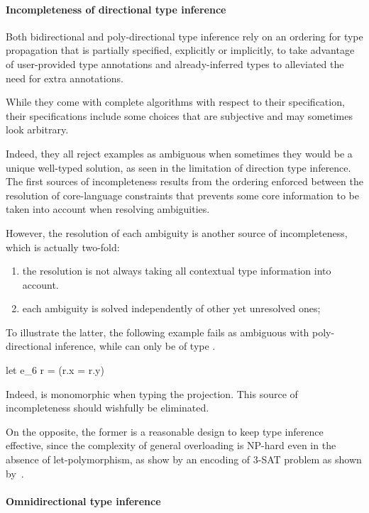 \documentclass[acmsmall,screen,nonacm]{acmart}
\begin{document}
\paragraph{Incompleteness of directional type inference}

Both bidirectional and poly-directional type inference rely on an ordering
for type propagation that is partially specified, explicitly or implicitly,
to take advantage of user-provided type annotations and already-inferred types
to alleviated the need for extra annotations.

While they come with complete algorithms with respect to their
specification, their specifications include some choices that are subjective
and may sometimes look arbitrary.

Indeed, they all reject examples as ambiguous when sometimes they would be a
unique well-typed solution, as seen in the limitation of direction type
inference.  The first sources of incompleteness results from the ordering
enforced between the resolution of core-language constraints that prevents
some core information to be taken into account when resolving ambiguities.

However, the resolution of each ambiguity is another source of
incompleteness, which is actually two-fold:
\begin{enumerate}
\item  
  the resolution is not always taking all contextual type information into
  account.  
\item
  each ambiguity is solved independently of other yet unresolved ones;
\end{enumerate}
To illustrate the latter, the following example fails as ambiguous with
poly-directional inference, while  can only be of type
.  
\begin{program}[error]
let e_6 r = (r.x = r.y)
\end{program}
Indeed,  is monomorphic when typing the projection.  This source of
incompleteness should wishfully be eliminated.

On the opposite, the former is a reasonable design to keep type inference
effective, since the complexity of general overloading is NP-hard even in
the absence of let-polymorphism, as show by an encoding of 3-SAT problem as
shown by~\citet {Chargueraud-Bodin-Dunfield-Riboulet/jfla2025}.


\paragraph{Omnidirectional type inference}
\end{document}
